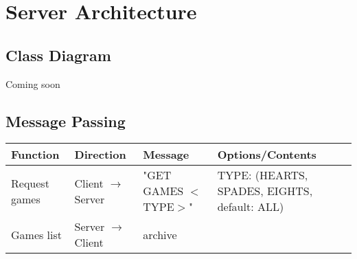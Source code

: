 \section{Server Architecture}
\subsection{Class Diagram}
Coming soon
\subsection{Message Passing}
\begin{center}
\begin{tabular}{|m{8em}|m{7em}|m{12em}|m{6em}|}
\hline
Function & Direction & Message & Options/Contents \\
\hline\hline
Request games & Client $\rightarrow$ Server & "GET GAMES $<$TYPE$>$" & TYPE: (HEARTS, SPADES, EIGHTS, default: ALL)\\
\hline
Games list & Server $\rightarrow$ Client & archive & 
\end{tabular}
\end{center}
